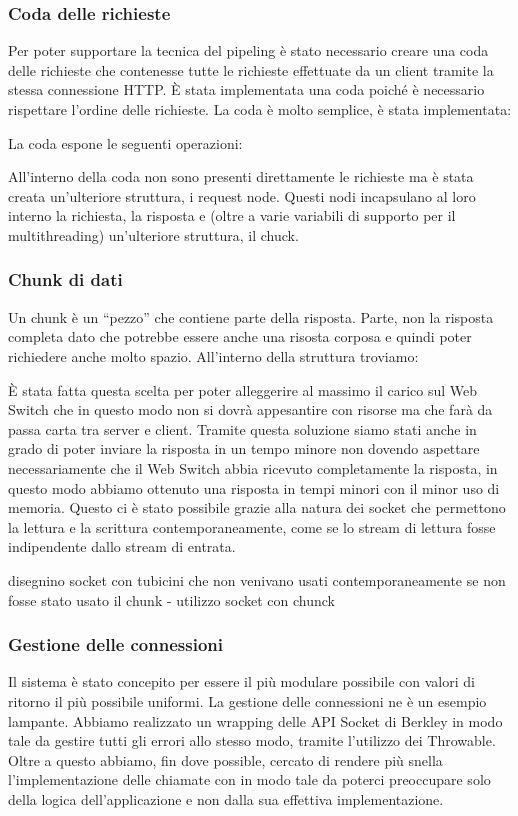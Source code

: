 \documentclass[italian]{tktltiki2}
\begin{document}
\subsubsection*{Coda delle richieste}
Per poter supportare la tecnica del pipeling è stato necessario creare una coda delle richieste che contenesse tutte le richieste effettuate da un client tramite la stessa connessione HTTP. È stata implementata una coda poiché è necessario rispettare l'ordine delle richieste. 
La coda è molto semplice, è stata implementata:

La coda espone le seguenti operazioni:

All'interno della coda non sono presenti direttamente le richieste ma è stata creata un'ulteriore struttura, i request node. Questi nodi incapsulano al loro interno la richiesta, la risposta e (oltre a varie variabili di supporto per il multithreading) un'ulteriore struttura, il chuck. 
\subsubsection*{Chunk di dati}
\label{sec:chunk}
Un chunk è un ``pezzo'' che contiene parte della risposta. Parte, non la risposta completa dato che potrebbe essere anche una risosta corposa e quindi poter richiedere anche molto spazio. All'interno della struttura troviamo:

È stata fatta questa scelta per poter alleggerire al massimo il carico sul Web Switch che in questo modo non si dovrà appesantire con risorse ma che farà da passa carta tra server e client. Tramite questa soluzione siamo stati anche in grado di poter inviare la risposta in un tempo minore non dovendo aspettare necessariamente che il Web Switch abbia ricevuto completamente la risposta, in questo modo abbiamo ottenuto una risposta in tempi minori con il minor uso di memoria. Questo ci è stato possibile grazie alla natura dei socket che permettono la lettura e la scrittura contemporaneamente, come se lo stream di lettura fosse indipendente dallo stream di entrata.

disegnino socket con tubicini che non venivano usati contemporaneamente se non fosse stato usato il chunk -  utilizzo socket con chunck
\subsubsection{Gestione delle connessioni}
Il sistema è stato concepito per essere il più modulare possibile con valori di ritorno il più possibile uniformi. La gestione delle connessioni ne è un esempio lampante. Abbiamo realizzato un wrapping delle API Socket di Berkley in modo tale da gestire tutti gli errori allo stesso modo, tramite l'utilizzo dei Throwable. Oltre a questo abbiamo, fin dove possible, cercato di rendere più snella l'implementazione delle chiamate con  in modo tale da poterci preoccupare solo della logica dell'applicazione e non dalla sua effettiva implementazione. 
\end{document}
